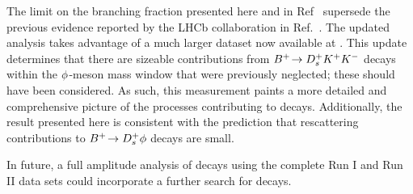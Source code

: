 

The limit on the \decay{\Bp}{\Dsp\phiz} branching fraction presented here and in Ref~\cite{LHCb-PAPER-2017-032} supersede the previous evidence reported by the LHCb collaboration in Ref.~\cite{LHCb-PAPER-2012-025}. The updated analysis takes advantage of a much larger dataset now available at \lhcb. 
This update determines that there are sizeable contributions from ${{{B}^+}}\!\rightarrow {\ensuremath{{D}^+_{s}}}{\ensuremath{{K}^+}}{\ensuremath{{K}^-}}$ decays within the $\phi$-meson mass window that were previously neglected; these should have been considered. As such, this measurement paints a more detailed and comprehensive picture of the processes contributing to \decay{\Bp}{\Dsp\Kp\Km} decays.
Additionally, the result presented here is consistent with the prediction that rescattering contributions to ${{{B}^+}}\!\rightarrow {\ensuremath{{D}^+_{s}}}\phi$ decays are small.

In future, a full amplitude analysis of \decay{\Bp}{\Dsp\Kp\Km} decays using the complete \lhcb Run I and Run II data sets could incorporate a further search for \decay{\Bp}{\Dsp\phiz} decays.


